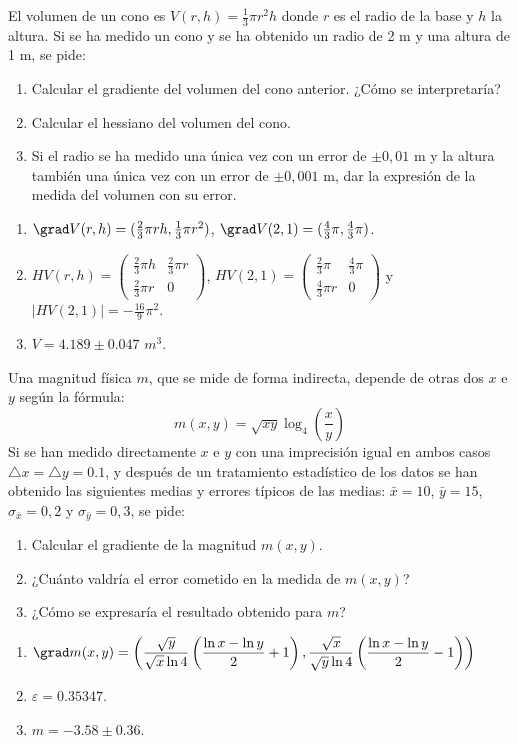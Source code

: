 {El volumen de un cono es $V(r,h)=\frac{1}{3}\pi r^2 h$ donde $r$ es el radio de la base y $h$ la altura. Si se ha medido un cono y se ha
obtenido un radio de 2 m y una altura de 1 m, se pide:
\begin{enumerate}
\item Calcular el gradiente del volumen del cono anterior. ¿Cómo se interpretaría?
\item Calcular el hessiano del volumen del cono.
\item Si el radio se ha medido una única vez con un error de $\pm 0,01$ m y la altura también una única vez con un error de $\pm 0,001$ m,
dar la expresión de la medida del volumen con su error.
\end{enumerate}
}
{\begin{enumerate}
\item $\grad V(r,h)=(\frac{2}{3}\pi r h,\frac{1}{3}\pi r^2)$, $\grad V(2,1) = (\frac{4}{3}\pi,\frac{4}{3}\pi)$.
\item $H V(r,h)=\left(
\begin{array}{cc}
\frac{2}{3}\pi h & \frac{2}{3}\pi r\\
\frac{2}{3}\pi r & 0
\end{array}
\right)$,
$H V(2,1)=\left(
\begin{array}{cc}
\frac{2}{3}\pi & \frac{4}{3}\pi\\
\frac{4}{3}\pi r & 0
\end{array}
\right)$
y
$|H V(2,1)| = -\frac{16}{9}\pi^2$.
\item $V=4.189\pm 0.047$ $m^3$.
\end{enumerate}
}
{}


{Una magnitud física $m$, que se mide de forma indirecta, depende de otras dos $x$ e $y$ según la fórmula:
\[
m(x,y) = \sqrt{xy}\log _4 \left(\frac{x}{y}\right)
\]
Si se han medido directamente $x$ e $y$ con una imprecisión igual en ambos casos $\triangle x=\triangle y=0.1$, y después de un tratamiento
estadístico de los datos se han obtenido las siguientes medias y errores típicos de las medias: $\bar{x}=10$, $\bar{y}=15$,
$\sigma_{\bar{x}}=0,2$ y $\sigma_{\bar{y}}=0,3$, se pide:

\begin{enumerate}
\item Calcular el gradiente de la magnitud $m(x,y)$.
\item ¿Cuánto valdría el error cometido en la medida de $m(x,y)$?
\item ¿Cómo se expresaría el resultado obtenido para $m$?
\end{enumerate}
}
{\begin{enumerate}
\item $\grad m(x,y)=\left(\dfrac{\sqrt y}{\sqrt x \ln 4}\left(\dfrac{\ln x-\ln y}{2}+1\right), \dfrac{\sqrt x}{\sqrt y \ln
4}\left(\dfrac{\ln x-\ln y}{2}-1\right) \right)$
\item $\varepsilon = 0.35347$.
\item $m=-3.58\pm 0.36$.
\end{enumerate}
}
{}
